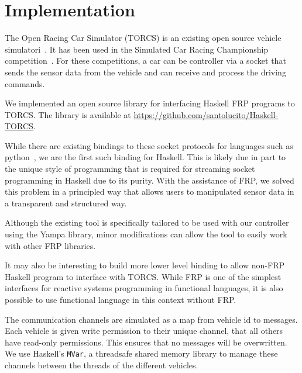 \section{Implementation}

The Open Racing Car Simulator (TORCS) is an existing open source vehicle simulatori~\cite{torcs}.
It has been used in the Simulated Car Racing Championship competition~\cite{SCRC}.
For these competitions, a car can be controller via a socket that sends the sensor data from the vehicle and can receive and process the driving commands.

We implemented an open source library for interfacing Haskell FRP programs to TORCS.
The library is available at \url{https://github.com/santolucito/Haskell-TORCS}.

While there are existing bindings to these socket protocols for languages such as python~\cite{snakeoil,pyscrc}, we are the first such binding for Haskell.
This is likely due in part to the unique style of programming that is required for streaming socket programming in Haskell due to its purity.
With the assistance of FRP, we solved this problem in a principled way that allows users to manipulated sensor data in a transparent and structured way.


Although the existing tool is specifically tailored to be used with our controller using the Yampa library,
  minor modifications can allow the tool to easily work with other FRP libraries.

It may also be interesting to build more lower level binding to allow non-FRP Haskell program to interface with TORCS.
While FRP is one of the simplest interfaces for reactive systems programming in functional languages, it is also possible to use functional language in this context without FRP.


The communication channels are simulated as a map from vehicle id to messages.
Each vehicle is given write permission to their unique channel, that all others have read-only permissions.
This ensures that no messages will be overwritten.
We use Haskell's \texttt{MVar}, a threadsafe shared memory library to manage these channels between the threads of the different vehicles.

